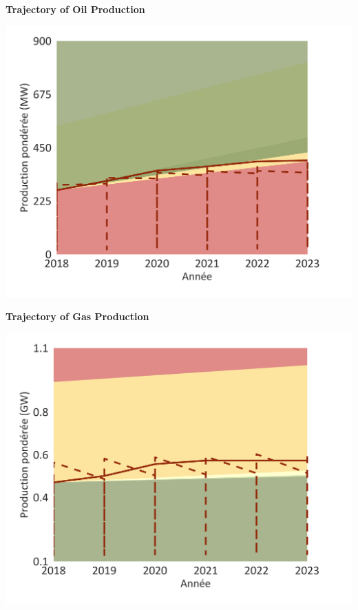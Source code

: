 \documentclass[10pt,table,a4]{article}\usepackage[]{graphicx}\usepackage[]{color}
\begin{document}
	\begin{minipage}[t]{.49\linewidth}
		\textbf{Trajectory of Oil Production }
		
		\includegraphics[trim = {0 0cm 0 0},width=1\linewidth]{ReportOutputs/Fig18}
		
	\end{minipage}	
	\hspace{.02\linewidth}
	\begin{minipage}[t]{.49\textwidth}
		\textbf{Trajectory of Gas Production }
		
		\includegraphics[trim = {0 0cm 0 0},width=1\linewidth]{ReportOutputs/Fig19}
		
	\end{minipage}
	
\end{document}
